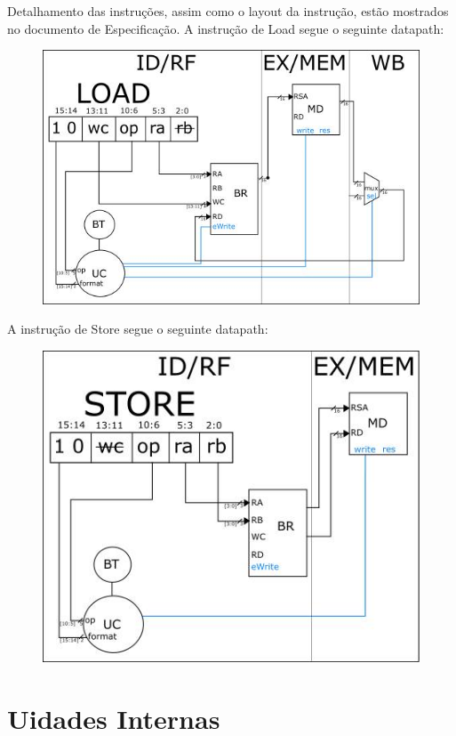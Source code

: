 \documentclass{article}
\begin{document}
  Detalhamento das instruções, assim como o layout da instrução, estão mostrados no documento de Especificação.
  A instrução de Load segue o seguinte datapath:
  \begin{figure}[H]
	\centering
	\includegraphics[scale=0.58]{./pictures/load.png}
\end{figure}  
\newpage
A instrução de Store segue o seguinte datapath:
\begin{figure}[H]
	\centering
	\includegraphics[scale=0.58]{./pictures/store.png}
\end{figure}  
  
  
  \newpage
  
  
  
\section{Uidades Internas}
\end{document}
